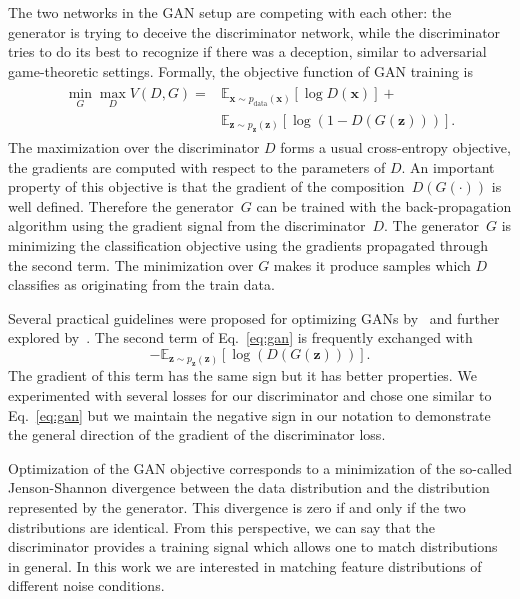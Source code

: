 \documentclass[a4paper]{article}
\begin{document}
    The two networks in the GAN setup are competing with each other: the 
    generator is trying to deceive the discriminator network, while the discriminator tries
    to do its best to recognize if there was a deception, similar to adversarial game-theoretic settings.    
    Formally, the objective function of GAN training is
    \begin{align}
    \begin{split}
        \min_G \max_D V(D, G) = &\mathbb{E}_{\bm{x} \sim p_{\text{data}}(\bm{x})}[\log D(\bm{x})] + \\
            &\mathbb{E}_{\bm{z} \sim p_{\bm{z}}(\bm{z})}[\log (1 - D(G(\bm{z})))].
    \end{split}
    \label{eq:gan}
    \end{align}
    The maximization over the discriminator $D$ forms a usual cross-entropy objective, the gradients are
    computed with respect to the parameters of $D$. An important property of
    this objective is that the gradient of the composition~$D(G(\cdot))$ is well
    defined. Therefore the generator~$G$ can be trained with the back-propagation
    algorithm using the gradient signal from the discriminator~$D$.
    The generator~$G$ is
    minimizing the classification objective using the gradients
    propagated through the second term. The minimization over $G$ makes it
    produce samples which $D$ classifies as originating from the train data.

    Several practical guidelines were proposed for optimizing GANs by~\cite{radford2015unsupervised} and 
    further explored by~\cite{salimans2016improved}. The second term of Eq.~\ref{eq:gan}
    is frequently exchanged with
    \begin{equation}
        - \mathbb{E}_{\bm{z} \sim p_{\bm{z}}(\bm{z})}[\log (D(G(\bm{z})))].
    \end{equation}
    The gradient of this term has the same sign but it has better properties.
    We experimented with several losses for our discriminator and chose one
    similar to Eq.~\ref{eq:gan} but we maintain the negative sign in our notation
    to demonstrate the general direction of the gradient of the discriminator loss.

    Optimization of the GAN objective corresponds to a minimization of the
    so-called Jenson-Shannon divergence between the data distribution and the
    distribution represented by the generator. This divergence is zero if and
    only if the two distributions are identical. From this perspective, we can
    say that the discriminator provides a training signal which allows
    one to match distributions in general. In this work we are interested in
    matching feature distributions of different noise conditions.
\end{document}

